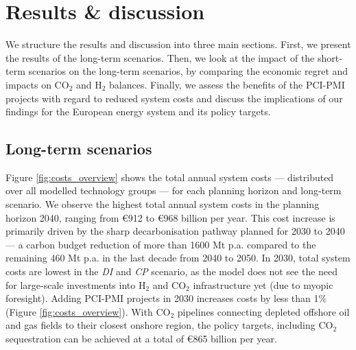 \documentclass[pdflatex,sn-nature]{sn-jnl}%
\theoremstyle{thmstyleone}%
\theoremstyle{thmstyletwo}%
\theoremstyle{thmstylethree}%
\begin{document}
\section{Results \& discussion}\label{sec:results}
We structure the results and discussion into three main sections. First, we present the results of the long-term scenarios. Then, we look at the impact of the short-term scenarios on the long-term scenarios, by comparing the economic regret and impacts on CO$_2$ and H$_2$ balances. Finally, we assess the benefits of the PCI-PMI projects with regard to reduced system costs and discuss the implications of our findings for the European energy system and its policy targets. 

\subsection{Long-term scenarios}\label{sec:long-term_scenarios}
Figure \ref{fig:costs_overview} shows the total annual system costs --- distributed over all modelled technology groups --- for each planning horizon and long-term scenario. We observe the highest total annual system costs in the planning horizon 2040, ranging from €912 to €968 billion per year. This cost increase is primarily driven by the sharp decarbonisation pathway planned for 2030 to 2040 --- a carbon budget reduction of more than 1600 Mt p.a. compared to the remaining 460 Mt p.a. in the last decade from 2040 to 2050. In 2030, total system costs are lowest in the \textit{DI} and \textit{CP} scenario, as the model does not see the need for large-scale investments into H$_2$ and CO$_2$ infrastructure yet (due to myopic foresight). Adding PCI-PMI projects in 2030 increases costs by less than 1\% (Figure \ref{fig:costs_overview}). With CO$_2$ pipelines connecting depleted offshore oil and gas fields to their closest onshore region, the policy targets, including CO$_2$ sequestration can be achieved at a total of €865 billion per year.
\end{document}
